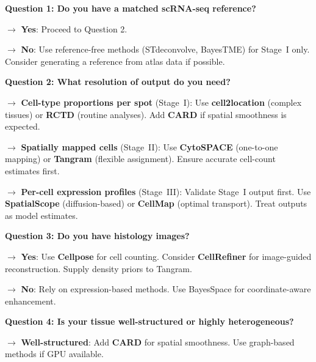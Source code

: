\begin{tcolorbox}[title=Box 2: Decision tree for method selection]

\textbf{Question 1: Do you have a matched scRNA-seq reference?}

\hspace{1em} $\rightarrow$ \textbf{Yes}: Proceed to Question 2.

\hspace{1em} $\rightarrow$ \textbf{No}: Use reference-free methods (STdeconvolve, BayesTME) for Stage~I only. Consider generating a reference from atlas data if possible.

\vspace{0.5em}

\textbf{Question 2: What resolution of output do you need?}

\hspace{1em} $\rightarrow$ \textbf{Cell-type proportions per spot} (Stage~I): Use \textbf{cell2location} (complex tissues) or \textbf{RCTD} (routine analyses). Add \textbf{CARD} if spatial smoothness is expected.

\hspace{1em} $\rightarrow$ \textbf{Spatially mapped cells} (Stage~II): Use \textbf{CytoSPACE} (one-to-one mapping) or \textbf{Tangram} (flexible assignment). Ensure accurate cell-count estimates first.

\hspace{1em} $\rightarrow$ \textbf{Per-cell expression profiles} (Stage~III): Validate Stage~I output first. Use \textbf{SpatialScope} (diffusion-based) or \textbf{CellMap} (optimal transport). Treat outputs as model estimates.

\vspace{0.5em}

\textbf{Question 3: Do you have histology images?}

\hspace{1em} $\rightarrow$ \textbf{Yes}: Use \textbf{Cellpose} for cell counting. Consider \textbf{CellRefiner} for image-guided reconstruction. Supply density priors to Tangram.

\hspace{1em} $\rightarrow$ \textbf{No}: Rely on expression-based methods. Use BayesSpace for coordinate-aware enhancement.

\vspace{0.5em}

\textbf{Question 4: Is your tissue well-structured or highly heterogeneous?}

\hspace{1em} $\rightarrow$ \textbf{Well-structured}: Add \textbf{CARD} for spatial smoothness. Use graph-based methods if GPU available.


\end{tcolorbox}
